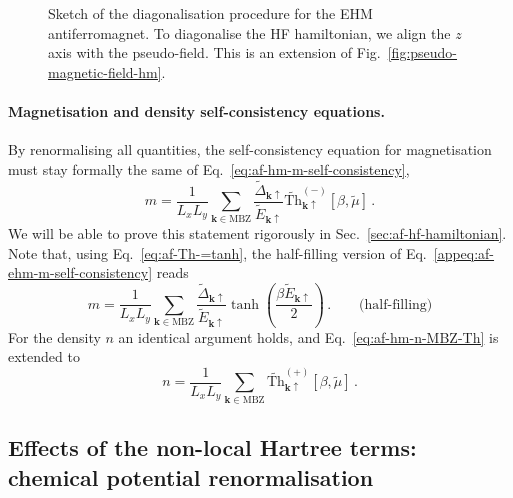 \begin{figure}
	\centering
	
	\caption{Sketch of the diagonalisation procedure for the EHM antiferromagnet. To diagonalise the HF hamiltonian, we align the $z$ axis with the pseudo-field. This is an extension of Fig.~\ref{fig:pseudo-magnetic-field-hm}.}
	\label{fig:pseudo-magnetic-field-ehm}
\end{figure}

\paragraph{Magnetisation and density self-consistency equations.}

By renormalising all quantities, the self-consistency equation for magnetisation must stay formally the same of Eq.~\eqref{eq:af-hm-m-self-consistency},
\begin{equation}\label{appeq:af-ehm-m-self-consistency}
	m = \frac{1}{L_x L_y} \sum_{\mathbf{k} \in \mathrm{MBZ}} \frac{\tilde{\Delta}_{\mathbf{k}\uparrow}}{\tilde{E}_{\mathbf{k}\uparrow}} \tilde{\mathrm{Th}}_{\mathbf{k}\uparrow}^{(-)}[\beta,\tilde{\mu}] \, .
\end{equation}
We will be able to prove this statement rigorously in Sec.~\ref{sec:af-hf-hamiltonian}. Note that, using Eq.~\eqref{eq:af-Th-=tanh}, the half-filling version of Eq.~\eqref{appeq:af-ehm-m-self-consistency} reads
\begin{equation}\label{appeq:af-ehm-m-self-consistency-mu=0}
	m = \frac{1}{L_x L_y} \sum_{\mathbf{k} \in \mathrm{MBZ}} \frac{\tilde{\Delta}_{\mathbf{k}\uparrow}}{\tilde{E}_{\mathbf{k}\uparrow}} \tanh(\frac{\beta \tilde{E}_{\mathbf{k}\uparrow}}{2}) \, .
	\qquad
	\text{(half-filling)}
\end{equation}
For the density $n$ an identical argument holds, and Eq.~\eqref{eq:af-hm-n-MBZ-Th} is extended to
\begin{equation}\label{eq:af-ehm-n-MBZ-Th}
	n = \frac{1}{L_x L_y} \sum_{\mathbf{k} \in \mathrm{MBZ}} \tilde{\mathrm{Th}}_{\mathbf{k}\uparrow}^{(+)}[\beta,\tilde{\mu}] \, .
\end{equation}

\subsection{Effects of the non-local Hartree terms: chemical potential renormalisation}\label{subsec:af-hartree-mu}


